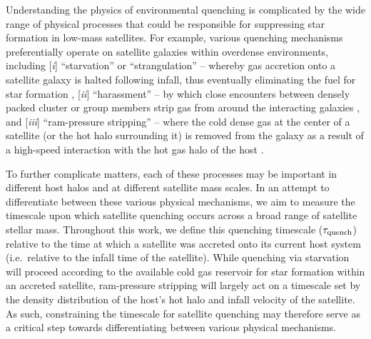 \documentclass[usenatbib]{mn2e}
\begin{document}
Understanding the physics of environmental quenching is complicated by
the wide range of physical processes that could be responsible for
suppressing star formation in low-mass satellites. For example,
various quenching mechanisms preferentially operate on satellite
galaxies within overdense environments, including [\emph{i}]
``starvation'' or ``strangulation'' -- whereby gas accretion onto a
satellite galaxy is halted following infall, thus eventually
eliminating the fuel for star formation \citep{larson80, kawata08},
[\emph{ii}] ``harassment'' -- by which close encounters between
densely packed cluster or group members strip gas from around the
interacting galaxies \citep{moore96}, and [\emph{iii}] ``ram-pressure
stripping'' -- where the cold dense gas at the center of a satellite
(or the hot halo surrounding it) is %
removed from the galaxy as a result of a high-speed interaction with
the hot gas halo of the host \citep{gunn72, bekki09}.
%

To further complicate matters, each of these processes may be
important in different host halos and at different satellite mass
scales.
%
In an attempt to differentiate between these various physical
mechanisms, we aim to measure the timescale upon which satellite
quenching occurs across a broad range of satellite stellar
mass. Throughout this work, we define this quenching timescale
($\tau_{\rm quench}$) relative to the time at which a satellite was
accreted onto its current host system (i.e.~relative to the infall
time of the satellite). While quenching via starvation will proceed
according to the available cold gas reservoir for star formation
within an accreted satellite, ram-pressure stripping will largely act
on a timescale set by the density distribution of the host's hot halo
and infall velocity of the satellite. As such, constraining the
timescale for satellite quenching may therefore serve as a critical
step towards differentiating between various physical mechanisms.
\end{document}
